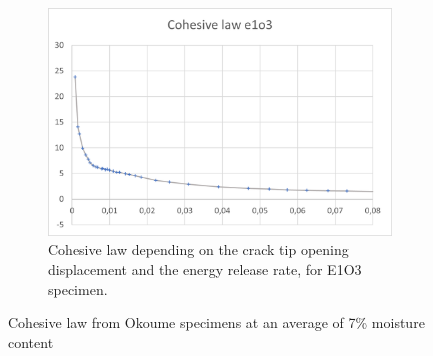 \begin{figure}[H]
\begin{subfigure}{0.48\linewidth}
		\centering
		\includegraphics[scale=0.6]{Figures/e1o3_colaw}
		\decoRule
		\caption[Cohesive law from E1O3 specimen]{Cohesive law depending on the crack tip opening displacement and the energy release rate, for E1O3 specimen.}
		\label{fig:E1O3_colaw}
	\end{subfigure}
	\caption{Cohesive law from Okoume specimens at an average of 7\% moisture content}
	\label{E1o_colaw}
\end{figure}

